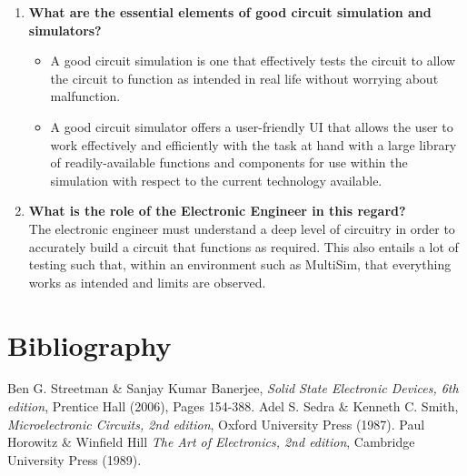 \documentclass[12pt]{article}
\begin{document}
\begin{enumerate}
\begin{itemize}
  \end{itemize}
  \item \textbf{What are the essential elements of good circuit simulation and simulators?} \hfill
  \begin{itemize}
  \item A good circuit simulation is one that effectively tests the circuit to allow the circuit to function as intended in real life without worrying about malfunction.
  \item A good circuit simulator offers a user-friendly UI that allows the user to work effectively and efficiently with the task at hand with a large library of readily-available functions and components for use within the simulation with respect to the current technology available.
  \end{itemize}
  \item \textbf{What is the role of the Electronic Engineer in this regard?} \hfill \\
  The electronic engineer must understand a deep level of circuitry in order to accurately build a circuit that functions as required. This also entails a lot of testing such that, within an environment such as MultiSim, that everything works as intended and limits are observed.
\end{enumerate}
\section{Bibliography}
\begin{thebibliography}{3}
  Ben G. Streetman \& Sanjay Kumar Banerjee,
  \emph{Solid State Electronic Devices, 6th edition},
  Prentice Hall (2006),
  Pages 154-388.
Adel S. Sedra \& Kenneth C. Smith,
  \emph{Microelectronic Circuits, 2nd edition},
  Oxford University Press (1987).
Paul Horowitz \& Winfield Hill
  \emph{The Art of Electronics, 2nd edition},
  Cambridge University Press (1989).
\end{thebibliography}
\end{document}
